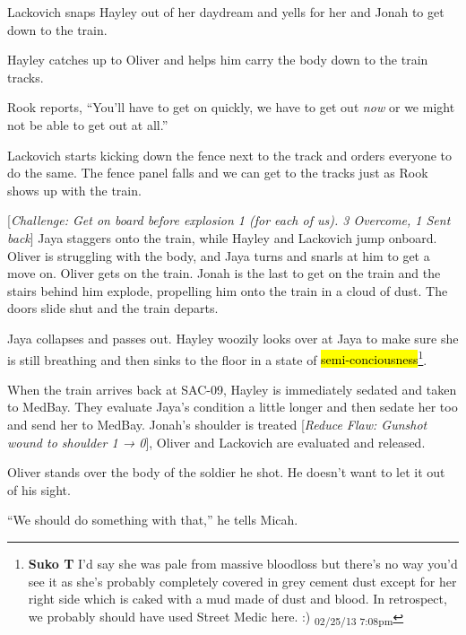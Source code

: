 Lackovich snaps Hayley out of her daydream and yells for her and Jonah to get down to the train.



Hayley catches up to Oliver and helps him carry the body down to the train tracks.



Rook reports, ``You'll have to get on quickly, we have to get out \textit{now} or we might not be able to get out at all.''



Lackovich starts kicking down the fence next to the track and orders everyone to do the same.  The fence panel falls and we can get to the tracks just as Rook shows up with the train.



{[}\textit{Challenge: Get on board before explosion 1 (for each of us).  3 Overcome, 1 Sent back}{]}  Jaya staggers onto the train, while Hayley and Lackovich jump onboard.  Oliver is struggling with the body, and Jaya turns and snarls at him to get a move on.  Oliver gets on the train.  Jonah is the last to get on the train and the stairs behind him explode, propelling him onto the train in a cloud of dust.  The doors slide shut and the train departs.



Jaya collapses and passes out. Hayley woozily looks over at Jaya to make sure she is still breathing and then sinks to the floor in a state of \hl{semi-conciousness}\footnote{\textbf{Suko T }I'd say she was pale from massive bloodloss but there's no way you'd see it as she's probably completely covered in grey cement dust except for her right side which is caked with a mud made of dust and blood.  In retrospect, we probably should have used Street Medic here. :) \textsubscript{02/25/13 7:08pm}}.






When the train arrives back at SAC-09, Hayley is immediately sedated and taken to MedBay.  They evaluate Jaya's condition a little longer and then sedate her too and send her to MedBay.  Jonah's shoulder is treated {[}\textit{Reduce Flaw: Gunshot wound to shoulder 1 → 0}{]}, Oliver and Lackovich are evaluated and released.



Oliver stands over the body of the soldier he shot. He doesn't want to let it out of his sight.

``We should do something with that,'' he tells Micah.

